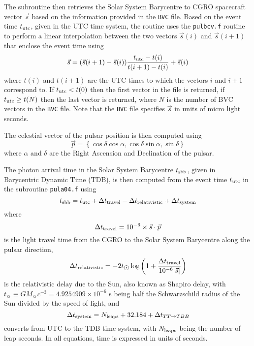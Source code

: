\documentclass{article}[12pt,a4]
\begin{document}
The subroutine then retrieves the Solar System Barycentre to CGRO spacecraft vector $\vec{s}$ based on the
information provided in the {\tt BVC} file.
Based on the event time $t_{\rm utc}$, given in the UTC time system, the routine uses the {\tt pulbcv.f} routine
to perform a linear interpolation between the two vectors $\vec{s}(i)$ and $\vec{s}(i+1)$ that enclose the event
time using
\begin{equation}
\vec{s} = (\vec{s}(i+1) - \vec{s}(i)) \frac{t_{\rm utc} - t(i) }{t(i+1) - t(i)} + \vec{s}(i)
\end{equation}
where $t(i)$ and $t(i+1)$ are the UTC times to which the vectors $i$ and $i+1$ correspond to.
If $t_{\rm utc}<t(0)$ then the first vector in the file is returned, if $t_{\rm utc}\ge t(N)$ then the last vector
is returned, where $N$ is the number of BVC vectors in the {\tt BVC} file.
Note that the {\tt BVC} file specifies $\vec{s}$ in units of micro light seconds.

The celestial vector of the pulsar position is then computed using
\begin{equation}
\vec{p} = \left\{ \cos \delta \cos \alpha, \cos \delta \sin \alpha, \sin \delta \right\}
\end{equation}
where $\alpha$ and $\delta$ are the Right Ascension and Declination of the pulsar.

The photon arrival time in the Solar System Barycentre $t_{\rm sbb}$, given in Barycentric Dynamic
Time (TDB), is then computed from the event time $t_{\rm utc}$ in the subroutine {\tt pula04.f} using
\begin{equation}
t_{\rm sbb} = t_{\rm utc} + \Delta t_{\rm travel} - \Delta t_{\rm relativistic} + \Delta t_{\rm system}
\end{equation}
where
\begin{equation}
\Delta t_{\rm travel} = 10^{-6} \times \vec{s} \cdot \vec{p} 
\end{equation}
is the light travel time from the CGRO to the Solar System Barycentre along the pulsar direction,
\begin{equation}
\Delta t_{\rm relativistic} = -2 t_{\hbox{$\odot$}} \log \left( 1 + \frac{ \Delta t_{\rm travel} }{10^{-6} | \vec{s} |} \right)
\end{equation}
is the relativistic delay due to the Sun, also known as Shapiro delay, with 
$t_{\sun} \equiv G M_{\sun} c^{-3} = 4.9254909 \times 10^{-6}$ s 
being half the Schwarzschild radius of the Sun divided by the speed of light, and
\begin{equation}
\Delta t_{\rm system} = N_{\rm leaps} + 32.184 + \Delta t_{TT \to TBB}
\end{equation}
converts from UTC to the TDB time system, with $N_{\rm leaps}$ being the number of leap seconds.
In all equations, time is expressed in units of seconds.
\end{document}
